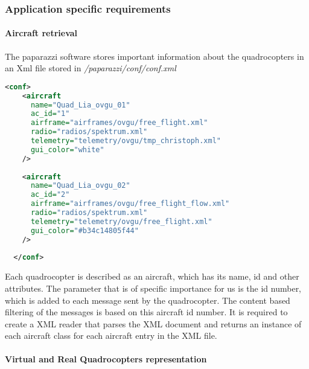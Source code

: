 \subsubsection{Application specific requirements}
\label{sec:requirementsApplication}

\paragraph{Aircraft retrieval}
\label{par:aircraftRetrieval}
The paparazzi software stores important information about the quadrocopters in an Xml file stored in \textit{/paparazzi/conf/conf.xml}

\begin{lstlisting}[basicstyle=\tiny, label={lst:AircraftXml}, language = Xml]
  <conf>
    <aircraft
      name="Quad_Lia_ovgu_01"
      ac_id="1"
      airframe="airframes/ovgu/free_flight.xml"
      radio="radios/spektrum.xml"
      telemetry="telemetry/ovgu/tmp_christoph.xml"
      gui_color="white"
    />
    
    <aircraft
      name="Quad_Lia_ovgu_02"
      ac_id="2"
      airframe="airframes/ovgu/free_flight_flow.xml"
      radio="radios/spektrum.xml"
      telemetry="telemetry/ovgu/free_flight.xml"
      gui_color="#b34c14805f44"
    />
  
  </conf>
\end{lstlisting}

Each quadrocopter is described as an aircraft, which has its name, id and other attributes. The parameter that is of specific importance for us is the id number, which is added to each message sent by the quadrocopter. The content based filtering of the messages is based on this aircraft id number. It is required to create a XML reader that parses the XML document and returns an instance of each aircraft class for each aircraft entry in the XML file.

\paragraph{Virtual and Real Quadrocopters representation}

